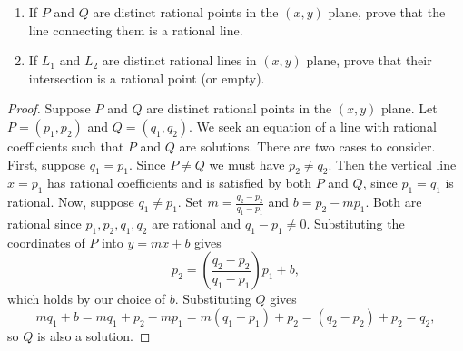 \newpage
\begin{tcolorbox}[title=Problem 1, breakable]
\begin{enumerate}
    \item If $P$ and $Q$ are distinct rational points in the $(x, y)$ plane,
    prove that the line connecting them is a rational line.
    \item If $L_1$ and $L_2$ are distinct rational lines in $(x, y)$ plane,
    prove that their intersection is a rational point (or empty).
\end{enumerate}
\end{tcolorbox}

\begin{proof}
    Suppose $P$ and $Q$ are distinct rational points in the $(x, y)$ plane.
    Let $P = (p_1, p_2)$ and $Q = (q_1, q_2)$.
    We seek an equation of a line with rational coefficients
        such that $P$ and $Q$ are solutions.
    There are two cases to consider.
    First, suppose $q_1 = p_1$.
    Since $P \ne Q$ we must have $p_2 \ne q_2$.
    Then the vertical line $x = p_1$ has rational coefficients
        and is satisfied by both $P$ and $Q$, since $p_1 = q_1$ is rational.
    Now, suppose $q_1 \ne p_1$.
    Set $m = \frac{q_2 - p_2}{q_1 - p_1}$ and $b = p_2 - m p_1$.
    Both are rational since $p_1, p_2, q_1, q_2$ are rational and $q_1 - p_1 \ne 0$.
    Substituting the coordinates of $P$ into $y = mx + b$ gives
    \[p_2 = \left( \frac{q_2 - p_2}{q_1 - p_1} \right) p_1 + b,\]
    which holds by our choice of $b$. Substituting $Q$ gives
    \[m q_1 + b = m q_1 + p_2 - m p_1 = m(q_1 - p_1) + p_2
        = (q_2 - p_2) + p_2 = q_2,\]
    so $Q$ is also a solution.
\end{proof}

